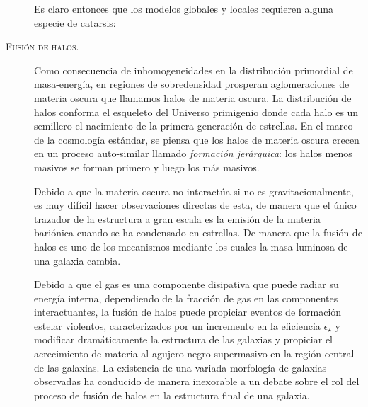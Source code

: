 \documentclass{article}
\begin{document}
\begin{description}
Es claro entonces que los modelos globales y locales requieren alguna especie de catarsis:

\item[\textsc{Fusión de halos.}] Como consecuencia de inhomogeneidades en la distribución primordial
de masa-energía, en regiones de sobredensidad prosperan aglomeraciones de materia oscura que
llamamos halos de materia oscura. La distribución de halos conforma el esqueleto del Universo
primigenio donde cada halo es un semillero el nacimiento de la primera generación de estrellas. En
el marco de la cosmología estándar, se piensa que los halos de materia oscura crecen en un proceso
auto-similar llamado \emph{formación jerárquica}: los halos menos masivos se forman primero y luego
los más masivos.

Debido a que la materia oscura no interactúa si no es gravitacionalmente, es muy difícil hacer
observaciones directas de esta, de manera que el único trazador de la estructura a gran escala es la
emisión de la materia bariónica cuando se ha condensado en estrellas. De manera que la fusión de
halos es uno de los mecanismos mediante los cuales la masa luminosa de una galaxia cambia.

Debido a que el gas es una componente disipativa que puede radiar su energía interna, dependiendo de
la fracción de gas en las componentes interactuantes, la fusión de halos puede propiciar eventos de
formación estelar violentos, caracterizados por un incremento en la eficiencia $\epsilon_\star$ y
modificar dramáticamente la estructura de las galaxias y propiciar el acrecimiento de materia al
agujero negro supermasivo en la región central de las galaxias. La existencia de una variada
morfología de galaxias observadas ha conducido de manera inexorable a un debate sobre el rol del
proceso de fusión de halos en la estructura final de una galaxia.


\end{description}
\end{document}
